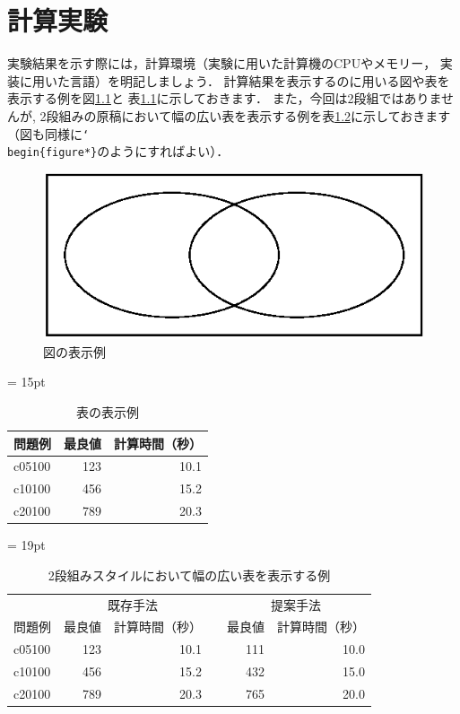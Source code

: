 \chapter{計算実験}\label{computational_result}
実験結果を示す際には，計算環境（実験に用いた計算機のCPUやメモリー，
実装に用いた言語）を明記しましょう．
計算結果を表示するのに用いる図や表を表示する例を図\ref{fig1}と
表\ref{table1}に示しておきます．
また，今回は2段組ではありませんが, 2段組みの原稿において幅の広い表を表示する例を表\ref{table2}に示しておきます
（図も同様に\texttt{\char`\\begin\{figure*\}}のようにすればよい）．

\begin{figure}[htbp]
 \centering
 \includegraphics[width=0.9\linewidth]{sample_fig.eps}
 \caption{図の表示例}
 \label{fig1}
\end{figure}

\begin{table}[htbp]
 \centering
 \tabcolsep = 15pt
 \renewcommand{\arraystretch}{0.8}
 \caption{表の表示例}
 \label{table1}
 \begin{tabular}{lrr} \hline
  問題例 & 最良値 & 計算時間（秒） \\ \hline
  c05100 &    123 & 10.1 \\
  c10100 &    456 & 15.2 \\
  c20100 &    789 & 20.3 \\ \hline
 \end{tabular}
\end{table}


\begin{table}
 \centering
 \tabcolsep = 19pt
 \renewcommand{\arraystretch}{0.8}
 \caption{2段組みスタイルにおいて幅の広い表を表示する例}
 \label{table2}
 \begin{tabular}{lrrcrr} \hline
  &\multicolumn{2}{c}{既存手法} && \multicolumn{2}{c}{提案手法}\\ \cline{2-3} \cline{5-6}
  
  問題例 & 最良値 & 計算時間（秒）&& 最良値 & 計算時間（秒） \\ \hline
  c05100 &    123 &          10.1 &&    111 &          10.0 \\
  c10100 &    456 &          15.2 &&    432 &          15.0 \\
  c20100 &    789 &          20.3 &&    765 &          20.0 \\ \hline
 \end{tabular}
\end{table}